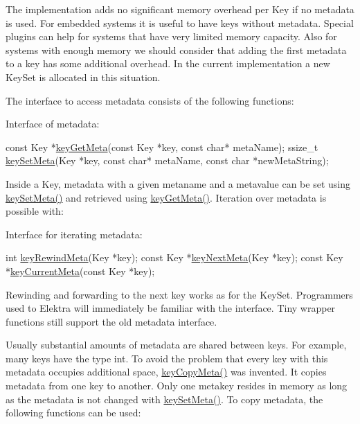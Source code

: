 The implementation adds no significant memory overhead per {\ttfamily Key} if no metadata is used. For embedded systems it is useful to have keys without metadata. Special plugins can help for systems that have very limited memory capacity. Also for systems with enough memory we should consider that adding the first metadata to a key has some additional overhead. In the current implementation a new {\ttfamily Key\+Set} is allocated in this situation.

The interface to access metadata consists of the following functions\+:

Interface of metadata\+:


\begin{DoxyCode}
\textcolor{keyword}{const} Key *\hyperlink{group__keymeta_ga9ed3875495ddb3d8a8d29158a60a147c}{keyGetMeta}(\textcolor{keyword}{const} Key *key, \textcolor{keyword}{const} \textcolor{keywordtype}{char}* metaName);
ssize\_t    \hyperlink{group__keymeta_gae1f15546b234ffb6007d8a31178652b9}{keySetMeta}(Key *key, \textcolor{keyword}{const} \textcolor{keywordtype}{char}* metaName,
        \textcolor{keyword}{const} \textcolor{keywordtype}{char} *newMetaString);
\end{DoxyCode}


Inside a {\ttfamily Key}, metadata with a given metaname and a metavalue can be set using {\ttfamily \hyperlink{group__keymeta_gae1f15546b234ffb6007d8a31178652b9}{key\+Set\+Meta()}} and retrieved using {\ttfamily \hyperlink{group__keymeta_ga9ed3875495ddb3d8a8d29158a60a147c}{key\+Get\+Meta()}}. Iteration over metadata is possible with\+:

Interface for iterating metadata\+:


\begin{DoxyCode}
\textcolor{keywordtype}{int} \hyperlink{group__keymeta_ga5dbb669802eea27e106ee3a5e39717a9}{keyRewindMeta}(Key *key);
\textcolor{keyword}{const} Key *\hyperlink{group__keymeta_ga4c88342f580a4291455a801af71ce048}{keyNextMeta}(Key *key);
\textcolor{keyword}{const} Key *\hyperlink{group__keymeta_ga74a273f529030f4947df52e14fdd2869}{keyCurrentMeta}(\textcolor{keyword}{const} Key *key);
\end{DoxyCode}


Rewinding and forwarding to the next key works as for the {\ttfamily Key\+Set}. Programmers used to Elektra will immediately be familiar with the interface. Tiny wrapper functions still support the old metadata interface.

Usually substantial amounts of metadata are shared between keys. For example, many keys have the type {\ttfamily int}. To avoid the problem that every key with this metadata occupies additional space, {\ttfamily \hyperlink{group__keymeta_ga9a22b992478e613c8788bd460b4a1f0c}{key\+Copy\+Meta()}} was invented. It copies metadata from one key to another. Only one metakey resides in memory as long as the metadata is not changed with {\ttfamily \hyperlink{group__keymeta_gae1f15546b234ffb6007d8a31178652b9}{key\+Set\+Meta()}}. To copy metadata, the following functions can be used\+:


